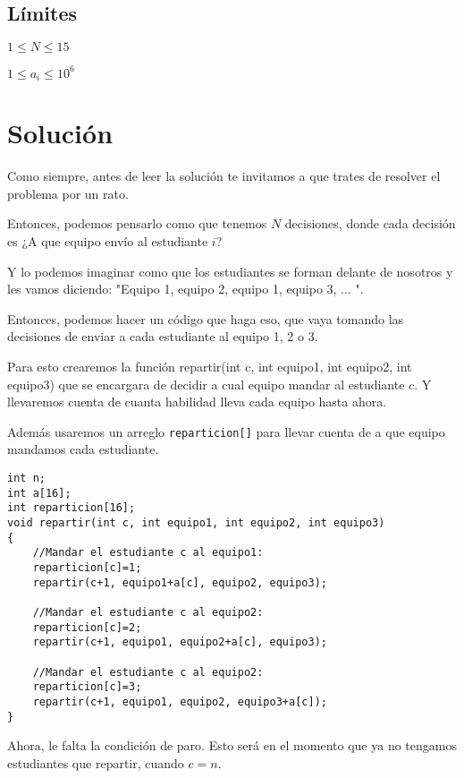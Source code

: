 \subsection*{Límites}
\begin{plimits}
	\item \(1\leq N \leq 15\)
	\item \(1\leq a_i \leq 10^6\)
\end{plimits}

\section*{Solución}

Como siempre, antes de leer la solución te invitamos a que trates de resolver el problema por un rato.

Entonces, podemos pensarlo como que tenemos \(N\) decisiones, donde cada decisión es ¿A que equipo envío al estudiante \(i\)?

Y lo podemos imaginar como que los estudiantes se forman delante de nosotros y les vamos diciendo: "Equipo 1, equipo 2, equipo 1, equipo 3, ... ".

Entonces, podemos hacer un código que haga eso, que vaya tomando las decisiones de enviar a cada estudiante al equipo 1, 2 o 3.

Para esto crearemos la función repartir(int c, int equipo1, int equipo2, int equipo3) que se encargara de decidir a cual equipo mandar al estudiante \(c\). 
Y llevaremos cuenta de cuanta habilidad lleva cada equipo hasta ahora.

Además usaremos un arreglo \verb|reparticion[]| para llevar cuenta de a que equipo mandamos cada estudiante.

\begin{lstlisting}
int n;
int a[16];
int reparticion[16];
void repartir(int c, int equipo1, int equipo2, int equipo3) 
{
	//Mandar el estudiante c al equipo1:
	reparticion[c]=1;
	repartir(c+1, equipo1+a[c], equipo2, equipo3);
	
	//Mandar el estudiante c al equipo2:
	reparticion[c]=2;
	repartir(c+1, equipo1, equipo2+a[c], equipo3);
	
	//Mandar el estudiante c al equipo2:
	reparticion[c]=3;
	repartir(c+1, equipo1, equipo2, equipo3+a[c]);
}
\end{lstlisting}

Ahora, le falta la condición de paro. Esto será en el momento que ya no tengamos estudiantes que repartir, cuando \(c=n\).

